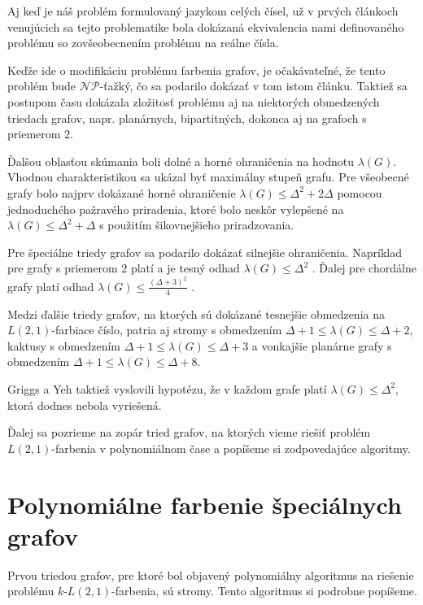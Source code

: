 Aj keď je náš problém formulovaný jazykom celých čísel, už v prvých článkoch
venujúcich sa tejto problematike bola dokázaná ekvivalencia
nami definovaného problému so zovšeobecnením problému na reálne čísla\cite{griggs_yeh_tree}.

Keďže ide o modifikáciu problému farbenia grafov, je očakávateľné, že tento
problém bude $\mathcal{NP}$-ťažký, čo sa podarilo dokázať v tom istom článku.
Taktiež sa postupom času dokázala zložitosť problému aj na niektorých obmedzených
triedach grafov, napr. planárnych, bipartitných, dokonca aj na grafoch s
priemerom $2$\cite{color_survey}.

Ďalšou oblasťou skúmania boli dolné a horné ohraničenia na hodnotu $\lambda(G)$.
Vhodnou charakteristikou sa ukázal byť maximálny stupeň grafu. Pre všeobecné
grafy bolo najprv dokázané horné ohraničenie $\lambda(G) \leq \Delta^2 + 2\Delta$
pomocou jednoduchého pažravého priradenia\cite{griggs_yeh_tree},
ktoré bolo neskôr vylepšené na $\lambda(G) \leq \Delta^2 + \Delta$ s použitím
šikovnejšieho priradzovania\cite{chang_kuo}.

Pre špeciálne triedy grafov sa podarilo dokázať silnejšie ohraničenia. Napríklad
pre grafy s priemerom $2$ platí a je tesný odhad $\lambda(G) \leq \Delta^2$\cite{griggs_yeh_tree}
. Ďalej pre chordálne grafy platí odhad $\lambda(G) \leq \frac{\left( \Delta + 3 \right)^2}{4}$\cite{griggs_yeh_tree}
.

Medzi ďalšie triedy grafov, na ktorých sú dokázané tesnejšie obmedzenia na $L(2,1)$-farbiace
číslo, patria aj stromy s obmedzením $\Delta + 1 \leq \lambda(G) \leq \Delta + 2$\cite{griggs_yeh_tree},
kaktusy s obmedzením $\Delta + 1 \leq \lambda(G) \leq \Delta + 3$ a vonkajšie planárne
grafy s obmedzením $\Delta + 1 \leq \lambda(G) \leq \Delta + 8$\cite{outer_planar_bound}.

Griggs a Yeh taktiež vyslovili hypotézu, že v každom grafe platí $\lambda(G) \leq \Delta^2$,
ktorá dodnes nebola vyriešená.

Ďalej sa pozrieme na zopár tried grafov, na ktorých vieme riešiť problém $L(2,1)$-farbenia
v polynomiálnom čase a popíšeme si zodpovedajúce algoritmy.

\section{Polynomiálne farbenie špeciálnych grafov}

Prvou triedou grafov, pre ktoré bol objavený polynomiálny algoritmus na riešenie
problému $k$-$L(2,1)$-farbenia, sú stromy\cite{chang_kuo}. Tento algoritmus si
podrobne popíšeme.

